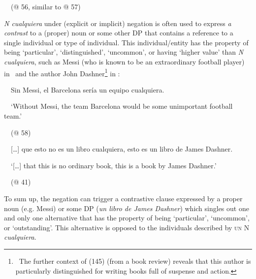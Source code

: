 \begin{styleStandard}
\ \ (@ 56, similar to @ 57)
\end{styleStandard}

\begin{styleStandard}
\textit{N cualquiera} under (explicit or implicit) negation is often used to express \textit{a contrast}\textbf{\textit{ }}to a (proper) noun or some other DP that contains a reference to a single individual or type of individual. This individual/entity has the property of being ‘particular’, ‘distinguished’, ‘uncommon’, or having ‘higher value’ than \textit{N cualquiera}, such as Messi (who is known to be an extraordinary football player) in \ and the author John Dashner\footnote{\ The further context of (145) (from a book review) reveals that this author is particularly distinguished for writing books full of suspense and action.} in :
\end{styleStandard}

\begin{styleStandard}
\label{bkm:Ref66615171}\ \ Sin Messi, el Barcelona sería un equipo cualquiera.
\end{styleStandard}

\begin{styleStandard}
\ \ ‘Without Messi, the team Barcelona would be some unimportant football team.’
\end{styleStandard}

\begin{styleStandard}
\ \ (@ 58)
\end{styleStandard}

\begin{styleStandard}
\label{bkm:Ref150779604}\ \ […] que esto no es un libro cualquiera, esto es un libro de James Dashner.
\end{styleStandard}

\begin{styleStandard}
\ \ ‘[…] that this is no ordinary book, this is a book by James Dashner.’
\end{styleStandard}

\begin{styleStandard}
\ \ (@ 41)
\end{styleStandard}

\begin{styleStandard}
To sum up, the negation can trigger a contrastive clause expressed by a proper noun (e.g. Messi) or some DP (\textit{un libro de James Dashner}) which singles out one and only one alternative that has the property of being ‘particular’, ‘uncommon’, or ‘outstanding’. This alternative is opposed to the individuals described by \textsc{un} N \textit{cualquiera}.
\end{styleStandard}

